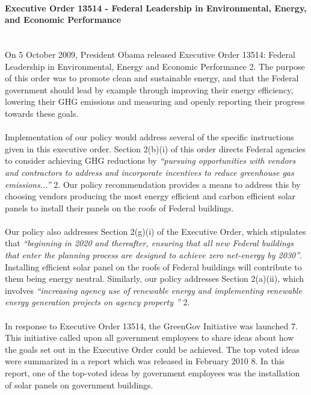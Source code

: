\paragraph{Executive Order 13514 - Federal Leadership in Environmental, Energy, and Economic Performance} 
\mbox{  }\\
On 5 October 2009, President Obama released Executive Order 13514: Federal Leadership in Environmental, Energy and Economic Performance \cite{debbie}{2}. The purpose of this order was to promote clean and sustainable energy, and that the Federal government should lead by example through improving their energy efficiency, lowering their GHG emissions and measuring and openly reporting their progress towards these goals.
\\\\
\noindent Implementation of our policy would address several of the specific instructions given in this executive order. Section 2(b)(i) of this order directs Federal agencies to consider achieving GHG reductions by \textit{``pursuing opportunities with vendors and contractors to address and incorporate incentives to reduce greenhouse gas emissions...''} \cite{debbie}{2}. Our policy recommendation provides a means to address this by choosing vendors producing the most energy efficient and carbon efficient solar panels to install their panels on the roofs of Federal buildings.
\\\\
\noindent Our policy also addresses Section 2(g)(i) of the Executive Order, which stipulates that \textit{``beginning in 2020 and thereafter, ensuring that all new Federal buildings that enter the planning process are designed to achieve zero net-energy by 2030''}. Installing efficient solar panel on the roofs of Federal buildings will contribute to them being energy neutral. Similarly, our policy addresses Section 2(a)(ii), which involves \textit{``increasing agency use of renewable energy and implementing renewable energy generation projects on agency property ''} \cite{debbie}{2}.
\\\\
\noindent In response to Executive Order 13514, the GreenGov Initiative was launched \cite{debbie}{7}. This initiative called upon all government employees to share ideas about how the goals set out in the Executive Order could be achieved. The top voted ideas were summarized in a report which was released in February 2010 \cite{debbie}{8}. In this report, one of the top-voted ideas by government employees was the installation of solar panels on government buildings.

